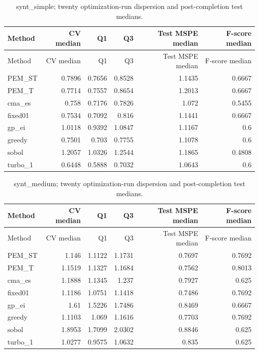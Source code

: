 \documentclass[cmc,article,submit,moreauthors,pdftex]{Definitions/tsp}
\begin{document}
\begin{longtable}[]{@{}lrrrrr@{}}
\caption{synt\_simple; twenty optimization-run dispersion and post-completion test medians.}\tabularnewline
\toprule
Method & CV median & Q1 & Q3 & Test MSPE median & F-score median \\
\midrule
\endfirsthead
\toprule
Method & CV median & Q1 & Q3 & Test MSPE median & F-score median \\
\midrule
\endhead
PEM\_ST & 0.7896 & 0.7656 & 0.8528 & 1.1435 & 0.6667 \\
PEM\_T & 0.7714 & 0.7557 & 0.8654 & 1.2013 & 0.6667 \\
cma\_es & 0.758 & 0.7176 & 0.7826 & 1.072 & 0.5455 \\
fixed01 & 0.7534 & 0.7092 & 0.816 & 1.1441 & 0.6667 \\
gp\_ei & 1.0118 & 0.9392 & 1.0847 & 1.1167 & 0.6 \\
greedy & 0.7501 & 0.703 & 0.7755 & 1.1078 & 0.6 \\
sobol & 1.2057 & 1.0326 & 1.2544 & 1.1865 & 0.4808 \\
turbo\_1 & 0.6448 & 0.5888 & 0.7032 & 1.0643 & 0.6 \\
\bottomrule
\end{longtable}

\begin{longtable}[]{@{}lrrrrr@{}}
\caption{synt\_medium; twenty optimization-run dispersion and post-completion test medians.}\tabularnewline
\toprule
Method & CV median & Q1 & Q3 & Test MSPE median & F-score median \\
\midrule
\endfirsthead
\toprule
Method & CV median & Q1 & Q3 & Test MSPE median & F-score median \\
\midrule
\endhead
PEM\_ST & 1.146 & 1.1122 & 1.1731 & 0.7697 & 0.7692 \\
PEM\_T & 1.1519 & 1.1327 & 1.1684 & 0.7562 & 0.8013 \\
cma\_es & 1.1888 & 1.1345 & 1.237 & 0.7927 & 0.625 \\
fixed01 & 1.1186 & 1.0751 & 1.1418 & 0.7486 & 0.7692 \\
gp\_ei & 1.61 & 1.5226 & 1.7486 & 0.8469 & 0.6667 \\
greedy & 1.1103 & 1.069 & 1.1616 & 0.7703 & 0.7692 \\
sobol & 1.8953 & 1.7099 & 2.0302 & 0.8846 & 0.625 \\
turbo\_1 & 1.0277 & 0.9575 & 1.0632 & 0.835 & 0.625 \\
\bottomrule
\end{longtable}
\end{document}
